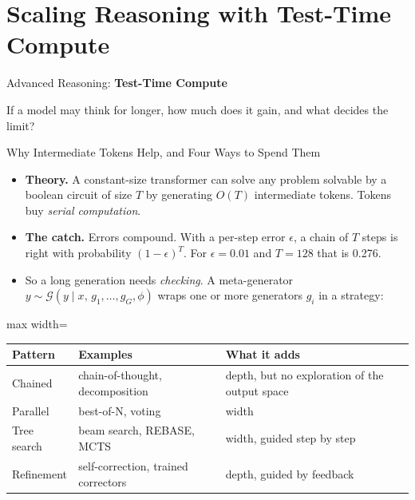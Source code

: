 \section{Scaling Reasoning with Test-Time Compute}

\begin{frame}{}
    \LARGE Advanced Reasoning: \textbf{Test-Time Compute}

    \vspace{1em}
    \normalsize If a model may think for longer, how much does it gain, and what decides the limit?
\end{frame}

\begin{frame}{Why Intermediate Tokens Help, and Four Ways to Spend Them}
    \begin{itemize}\itemsep0.3em
        \item \textbf{Theory.} A constant-size transformer can solve any problem solvable by a boolean circuit of size $T$ by generating $O(T)$ intermediate tokens. Tokens buy \emph{serial computation}.
        \item \textbf{The catch.} Errors compound. With a per-step error $\epsilon$, a chain of $T$ steps is right with probability $(1-\epsilon)^T$. For $\epsilon=0.01$ and $T=128$ that is 0.276.
        \item So a long generation needs \emph{checking}. A meta-generator $y\sim\mathcal{G}(y\mid x,\,g_1,\dots,g_G,\phi)$ wraps one or more generators $g_i$ in a strategy:
    \end{itemize}
    \begin{center}
    \small
    \begin{adjustbox}{max width=\linewidth}\begin{tabular}{lll}
        \toprule
        \textbf{Pattern} & \textbf{Examples} & \textbf{What it adds} \\
        \midrule
        Chained & chain-of-thought, decomposition & depth, but no exploration of the output space \\
        Parallel & best-of-N, voting & width \\
        Tree search & beam search, REBASE, MCTS & width, guided step by step \\
        Refinement & self-correction, trained correctors & depth, guided by feedback \\
        \bottomrule
    \end{tabular}\end{adjustbox}
    \end{center}
\end{frame}

